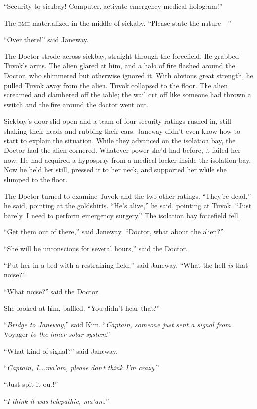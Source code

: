 \documentclass[twoside,letterpaper,12pt]{memoir}
\begin{document}
``Security to sickbay! Computer, activate emergency medical hologram!'' 

The \textsc{emh} materialized in the middle of sickaby. ``Please state the nature---'' 

``Over there!'' said Janeway. 

The Doctor strode across sickbay, straight through the forcefield. He grabbed Tuvok's arms. The alien glared at him, and a halo of fire flashed around the Doctor, who shimmered but otherwise ignored it. With obvious great strength, he pulled Tuvok away from the alien. Tuvok collapsed to the floor. The alien screamed and clambered off the table; the wail cut off like someone had thrown a switch and the fire around the doctor went out. 

Sickbay's door slid open and a team of four security ratings rushed in, still shaking their heads and rubbing their ears. Janeway didn't even know how to start to explain the situation. While they advanced on the isolation bay, the Doctor had the alien cornered. Whatever power she'd had before, it failed her now. He had acquired a hypospray from a medical locker inside the isolation bay. Now he held her still, pressed it to her neck, and supported her while she slumped to the floor. 

The Doctor turned to examine Tuvok and the two other ratings. ``They're dead,'' he said, pointing at the goldshirts. ``He's alive,'' he said, pointing at Tuvok. ``Just barely. I need to perform emergency surgery.'' The isolation bay forcefield fell. 

``Get them out of there,'' said Janeway. ``Doctor, what about the alien?'' 

``She will be unconscious for several hours,'' said the Doctor. 

``Put her in a bed with a restraining field,'' said Janeway. ``What the hell \textit{is} that noise?'' 

``What noise?'' said the Doctor. 

She looked at him, baffled. ``You didn't hear that?'' 

``\textit{Bridge to Janeway},'' said Kim. ``\textit{Captain, someone just sent a signal from }Voyager\textit{ to the inner solar system}.'' 

``What kind of signal?'' said Janeway. 

``\textit{Captain, I\ldots .ma'am, please don't think I'm crazy.}'' 

``Just spit it out!'' 

``\textit{I think it was telepathic, ma'am.}'' 
\end{document}
